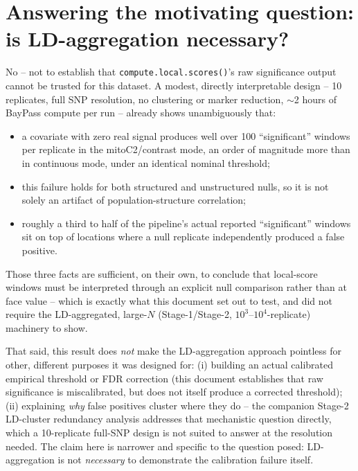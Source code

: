 \documentclass[11pt]{article}
\begin{document}
\section*{\color{Accent}Answering the motivating question: is LD-aggregation necessary?}
No -- not to establish that \texttt{compute.local.scores()}'s raw significance output cannot be
trusted for this dataset. A modest, directly interpretable design -- 10 replicates, full SNP
resolution, no clustering or marker reduction, $\sim$2 hours of BayPass compute per run -- already
shows unambiguously that:
\begin{itemize}
\item a covariate with zero real signal produces well over 100 ``significant'' windows per
  replicate in the mitoC2/contrast mode, an order of magnitude more than in continuous mode, under
  an identical nominal threshold;
\item this failure holds for both structured and unstructured nulls, so it is not solely an
  artifact of population-structure correlation;
\item roughly a third to half of the pipeline's actual reported ``significant'' windows sit on top
  of locations where a null replicate independently produced a false positive.
\end{itemize}
Those three facts are sufficient, on their own, to conclude that local-score windows must be
interpreted through an explicit null comparison rather than at face value -- which is exactly what
this document set out to test, and did not require the LD-aggregated, large-$N$ (Stage-1/Stage-2,
$10^3$--$10^4$-replicate) machinery to show.

That said, this result does \emph{not} make the LD-aggregation approach pointless for other,
different purposes it was designed for: (i) building an actual calibrated empirical threshold or
FDR correction (this document establishes that raw significance is miscalibrated, but does not
itself produce a corrected threshold); (ii) explaining \emph{why} false positives cluster where
they do -- the companion Stage-2 LD-cluster redundancy analysis addresses that mechanistic
question directly, which a 10-replicate full-SNP design is not suited to answer at the
resolution needed. The claim here is narrower and specific to the question posed: LD-aggregation
is not \emph{necessary} to demonstrate the calibration failure itself.
\end{document}
